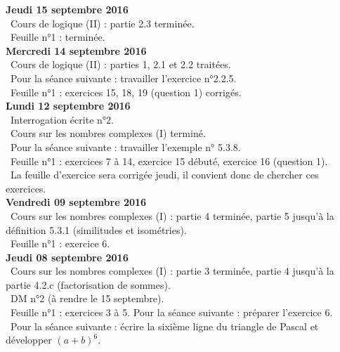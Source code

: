 \documentclass[12pt,a4paper]{article}
\begin{document}
\noindent\textbf{Jeudi 15 septembre 2016}\\
\bu\ Cours de logique (II) : partie 2.3 terminée.\\
\bu\ Feuille n°1 : terminée.\vspace{.4cm}\\

\noindent\textbf{Mercredi 14 septembre 2016}\\
\bu\ Cours de logique (II) : parties 1, 2.1 et 2.2 traitées.\\
\bu\ Pour la séance suivante : travailler l'exercice n°2.2.5.\\
\bu\ Feuille n°1 : exercices 15, 18, 19 (question 1) corrigés.\vspace{.4cm}\\

\noindent\textbf{Lundi 12 septembre 2016}\\
\bu\ Interrogation écrite n°2.\\
\bu\ Cours sur les nombres complexes (I) terminé.\\
\bu\ Pour la séance suivante : travailler l'exemple n° 5.3.8.\\
\bu\ Feuille n°1 : exercices 7 à 14, exercice 15 débuté, exercice 16 (question 1).\\
\bu\ La feuille d'exercice sera corrigée jeudi, il convient donc de chercher ces exercices.\vspace{.4cm}\\

\noindent\textbf{Vendredi 09 septembre 2016}\\
\bu\ Cours sur les nombres complexes (I) : partie 4 terminée, partie 5 jusqu'à la définition 5.3.1 (similitudes et isométries).\\
\bu\ Feuille n°1 : exercice 6.\vspace{.4cm}\\

\noindent\textbf{Jeudi 08 septembre 2016}\\
\bu\ Cours sur les nombres complexes (I) : partie 3 terminée, partie 4 jusqu'à la partie 4.2.c (factorisation de sommes).\\
\bu\ DM n°2 (à rendre le 15 septembre). \\
\bu\ Feuille n°1 : exercices 3 à 5. Pour la séance suivante : préparer l'exercice 6.\\
\bu\ Pour la séance suivante : écrire la sixième ligne du triangle de Pascal et développer $(a+b)^6$.\vspace{.4cm}\\
\end{document}

